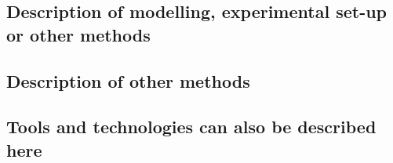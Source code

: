 
\subsection{Description of modelling, experimental set-up or other methods}

\lipsum[4]

\subsection{Description of other methods}

\lipsum[5]

\subsection{Tools and technologies can also be described here}

\lipsum[3]